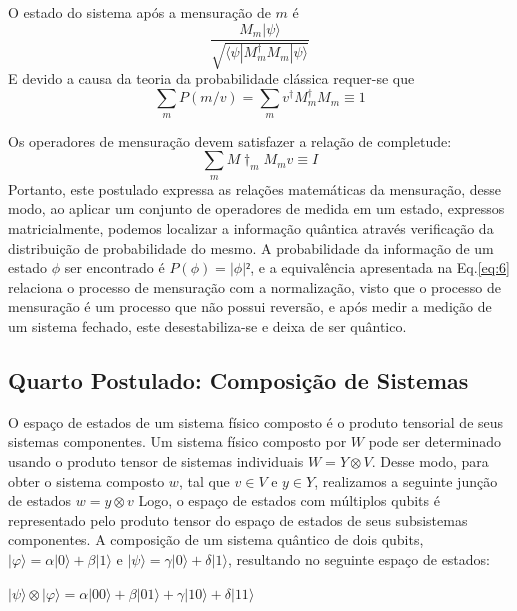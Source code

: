 \documentclass[tcc,capa]{texufpel}
\begin{document}
O estado do sistema após a mensuração de $m$ é
\begin{equation}
    \frac{M_m|\psi\rangle}{\sqrt{\langle\psi|M^\dagger_mM_m|\psi\rangle}}
\end{equation}
E devido a causa da teoria da probabilidade clássica requer-se que
\begin{equation}
    \sum\limits_{m}P(m/v) = \sum\limits_{m}v^\dagger M^\dagger_mM_m\equiv 1
\end{equation}

Os operadores de mensuração devem satisfazer a relação de completude:
\begin{equation}\label{eq:6}
    \sum\limits_{m}M\dagger_mM_mv\equiv I
\end{equation}
Portanto, este postulado expressa as relações matemáticas da mensuração, desse modo, ao aplicar um conjunto de operadores de medida em um estado, expressos matricialmente, podemos localizar a informação quântica através verificação da distribuição de probabilidade do mesmo. A probabilidade da informação de um estado $\phi$ ser encontrado é $P(\phi)=|\phi|²$, e a equivalência apresentada na Eq.\ref{eq:6} relaciona o processo de mensuração com a normalização, visto que o processo de mensuração é um processo que não possui reversão, e após medir a medição de um sistema fechado, este desestabiliza-se e deixa de ser quântico.

\subsection{Quarto Postulado: Composição de Sistemas}
O espaço de estados de um sistema físico composto é o produto tensorial de seus sistemas componentes. Um sistema físico composto por $W$ pode ser determinado usando o produto tensor de sistemas individuais $W= Y \otimes V$. Desse modo, para obter o sistema composto $w$, tal que $v \in V$ e $y \in Y$, realizamos a seguinte junção de estados $w= y \otimes v$ \cite{imre2005quantum}
Logo, o espaço de estados com múltiplos qubits é representado pelo produto tensor do espaço de estados de seus subsistemas componentes. A composição de um sistema quântico de dois qubits, $|\varphi\rangle= \alpha|0\rangle + \beta|1\rangle$ e $|\psi\rangle= \gamma|0\rangle + \delta|1\rangle$, resultando no seguinte espaço de estados:

 \begin{center} 
 $|\psi\rangle \otimes |\varphi\rangle= \alpha|00\rangle + \beta|01\rangle + \gamma|10\rangle + \delta|11\rangle $
 \end{center}
\end{document}
